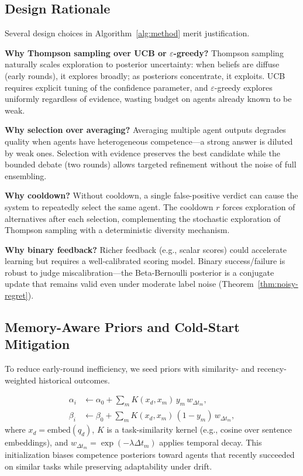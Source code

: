 \subsection{Design Rationale}
Several design choices in Algorithm~\ref{alg:method} merit justification.

\textbf{Why Thompson sampling over UCB or $\varepsilon$-greedy?}
Thompson sampling naturally scales exploration to posterior uncertainty: when beliefs are diffuse (early rounds), it explores broadly; as posteriors concentrate, it exploits. UCB requires explicit tuning of the confidence parameter, and $\varepsilon$-greedy explores uniformly regardless of evidence, wasting budget on agents already known to be weak.

\textbf{Why selection over averaging?}
Averaging multiple agent outputs degrades quality when agents have heterogeneous competence---a strong answer is diluted by weak ones. Selection with evidence preserves the best candidate while the bounded debate (two rounds) allows targeted refinement without the noise of full ensembling.

\textbf{Why cooldown?}
Without cooldown, a single false-positive verdict can cause the system to repeatedly select the same agent. The cooldown $r$ forces exploration of alternatives after each selection, complementing the stochastic exploration of Thompson sampling with a deterministic diversity mechanism.

\textbf{Why binary feedback?}
Richer feedback (e.g., scalar scores) could accelerate learning but requires a well-calibrated scoring model. Binary success/failure is robust to judge miscalibration---the Beta-Bernoulli posterior is a conjugate update that remains valid even under moderate label noise (Theorem~\ref{thm:noisy-regret}).

\subsection{Memory-Aware Priors and Cold-Start Mitigation}
\label{sec:memory}
To reduce early-round inefficiency, we seed priors with similarity- and recency-weighted historical outcomes.

\begin{align}
\alpha_i &\leftarrow \alpha_0 + \sum_{m} K(x_d,x_m)\, y_m \, w_{\Delta t_m}, \\
\beta_i  &\leftarrow \beta_0  + \sum_{m} K(x_d,x_m)\, (1-y_m)\, w_{\Delta t_m},
\end{align}
where $x_d=\mathrm{embed}(q_d)$, $K$ is a task-similarity kernel (e.g., cosine over sentence embeddings), and $w_{\Delta t_m}=\exp(-\lambda \Delta t_m)$ applies temporal decay.   This initialization biases competence posteriors toward agents that recently succeeded on similar tasks while preserving adaptability under drift.

